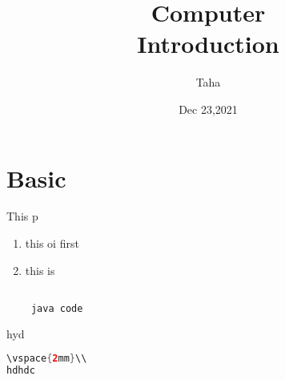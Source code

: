 \documentclass[a4paper]{article}
\title{Computer\\ \vspace{5mm}
\large Introduction}
\author{Taha}
\date{Dec 23,2021}
\begin{document}
\maketitle

\section{Basic}
This p
\begin{enumerate}
\item this oi first   
\item this is 
\begin{lstlisting}[language=Java]%]

 java code 
\end{lstlisting}


\end{enumerate}
hyd 
\begin{lstlisting}[language=Java]%]
 \vspace{2mm}\\ 
hdhdc 
\end{lstlisting}
\end{document}
